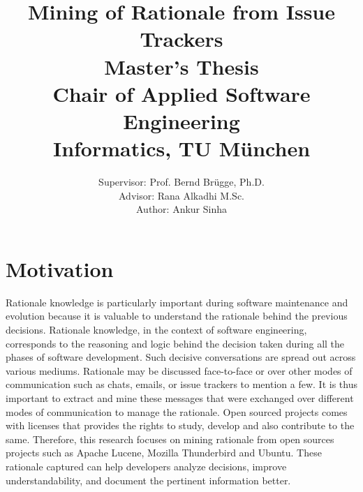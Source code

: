 \documentclass[dvips,12pt]{article}
\begin{document}

\title{  Mining of Rationale from Issue Trackers \\
	\bigbreak
	\large Master's Thesis \\
	\large Chair of Applied Software Engineering \\
	\large Informatics, TU M{\"u}nchen}

\author{Supervisor: Prof. Bernd Br{\"u}gge, Ph.D. \\
	Advisor: Rana Alkadhi M.Sc.\\
	Author: Ankur Sinha}
\date{}


\maketitle


\section{Motivation}


Rationale knowledge is particularly important during software maintenance and evolution because it is valuable to understand the rationale behind the previous decisions. Rationale knowledge, in the context of software engineering, corresponds to the reasoning and logic behind the decision taken during all the phases of software development. Such decisive conversations are spread out across various mediums. Rationale may be discussed face-to-face or over other modes of communication such as chats, emails, or issue trackers to mention a few. It is thus important to extract and mine these messages that were exchanged over different modes of communication to manage the rationale. Open sourced projects comes with licenses that provides the rights to study, develop and also contribute to the same. Therefore, this research focuses on mining rationale from open sources projects such as Apache Lucene, Mozilla Thunderbird and Ubuntu. These rationale captured can help developers analyze decisions, improve understandability, and document the pertinent information better.
\end{document}
